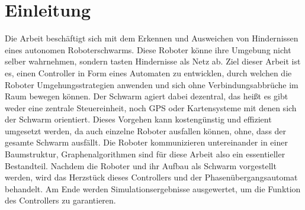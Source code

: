 \section{Einleitung}

Die Arbeit beschäftigt sich mit dem Erkennen und Ausweichen von Hindernissen eines autonomen 
Roboterschwarms. Diese Roboter könne ihre Umgebung nicht selber wahrnehmen, sondern tasten Hindernisse als
Netz ab. Ziel dieser Arbeit ist es, einen Controller in Form eines Automaten zu entwicklen, durch welchen
die Roboter Umgehungsstrategien anwenden und sich ohne Verbindungsabbrüche im Raum bewegen können. Der
Schwarm agiert dabei dezentral, das heißt es gibt weder eine zentrale Steuereinheit, noch GPS oder 
Kartensysteme mit denen sich der Schwarm orientiert. Dieses Vorgehen kann kostengünstig und effizient
umgesetzt werden, da auch einzelne Roboter ausfallen können, ohne, dass der gesamte Schwarm ausfällt. Die
Roboter kommunizieren untereinander in einer Baumstruktur, Graphenalgorithmen sind für diese Arbeit also
ein essentieller Bestandteil. Nachdem die Roboter und ihr Aufbau als Schwarm vorgestellt werden, wird das
Herzstück dieses Controllers und der Phasenübergangsautomat behandelt. Am Ende werden Simulationsergebnisse
ausgewertet, um die Funktion des Controllers zu garantieren.